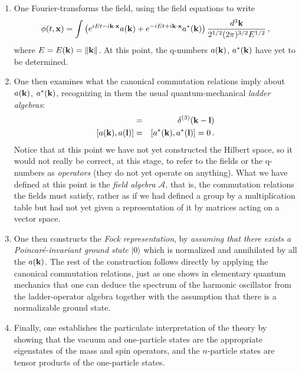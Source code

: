 \documentclass[
%
draft    %
,numberedheadings 
,bibliocites
  ]
  {aipproc}
\newcommand{\A}{{\mathcal A}}
\begin{document}
\begin{enumerate}

\item One Fourier-transforms the field, using the field equations to write
\begin{equation}
  \phi (t,{\bf x})=\int \left( e^{iEt-i{\bf k}\cdot {\bf x}} a({\bf k}) +e^{-iEt+i{\bf k}\cdot {\bf x}} a^*({\bf k})\right) 
  \frac{d^3{\bf k}}{2^{1/2}(2\pi )^{3/2}E^{1/2}}\, ,
\end{equation}
where $E=E({\bf k})=\| {\bf k}\|$.  At this point, the q-numbers $a({\bf k})$, $a^*({\bf k})$ have yet to be determined.

\item One then examines what the canonical commutation relations imply about $a({\bf k})$, $a^*({\bf k})$, recognizing in them the usual quantum-mechanical {\em ladder algebras}:
\begin{eqnarray}
  [a({\bf k}),a^*({\bf l})] &=& \delta ^{(3)}({\bf k}-{\bf l})\\
  \left[a ({\bf k}),a({\bf l})\right] &=&
      [a^* ({\bf k}),a^*({\bf l})]=0\, .
\end{eqnarray}
Notice that at this point we have not yet constructed the Hilbert space, so it would not really be correct, at this stage, to refer to the fields or the q-numbers as {\em operators} (they do not yet operate on anything).  What we have defined at this point is the {\em field algebra} $\A$, that is, the commutation relations the fields must satisfy, rather as if we had defined a group by a multiplication table but had not yet given a representation of it by matrices acting on a vector space.

\item One then constructs the {\em Fock representation}, by {\em assuming that there exists a Poincar\'e-invariant ground state} $|0\rangle$ which is normalized and annihilated by all the $a({\bf k})$.
The rest of the construction follows directly by applying the canonical commutation relations, just as one shows in elementary quantum mechanics that one can deduce the spectrum of the harmonic oscillator from the ladder-operator algebra together with the assumption that there is a normalizable ground state.

\item Finally, one establishes the particulate interpretation of the theory by showing 
that the vacuum and one-particle states are the appropriate eigenstates of the mass and spin operators, and the $n$-particle states are tensor products of the one-particle states.

\end{enumerate}
\end{document}
